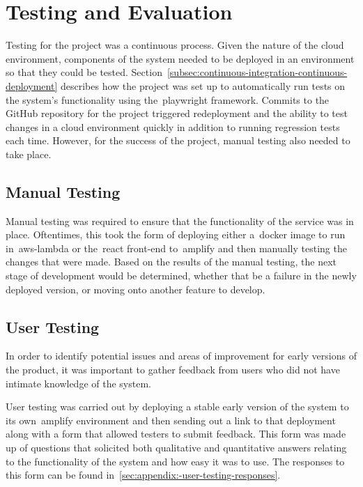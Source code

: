 \thispagestyle{plain}
\newpage
\section{Testing and Evaluation}\label{sec:testing-and-evaluation}

\normalsize

Testing for the project was a continuous process.
Given the nature of the cloud environment,
components of the system needed to be deployed in an environment so that they could be tested.
Section~\ref{subsec:continuous-integration-continuous-deployment} describes how the project was set up
to automatically run tests on the system's functionality using the~\gls{playwright} framework.
Commits to the GitHub repository for the project triggered redeployment and the ability
to test changes in a cloud environment quickly in addition to running regression tests each time.
However, for the success of the project, manual testing also needed to take place.

\subsection{Manual Testing}\label{subsec:manual-testing}

Manual testing was required to ensure that the functionality of the service was in place.
Oftentimes,
this took the form
of deploying either a~\gls{docker} image
to run in~\gls{aws-lambda} or the~\gls{react} front-end to~\gls{amplify} and
then manually testing the changes that were made.
Based on the results of the manual testing, the next stage of development would be determined,
whether that be a failure in the newly deployed version, or moving onto another feature to develop.

\subsection{User Testing}\label{subsec:user-testing}

In order to identify potential issues and areas of improvement for early versions of the product,
it was important to gather feedback from users who did not have intimate knowledge of the system.

User testing was carried out
by deploying a stable early version of the system to its own~\gls{amplify} environment
and then sending out a link to that deployment along with a form that allowed testers to submit feedback.
This form was made up of questions
that solicited both qualitative and quantitative answers relating to the functionality of the system
and how easy it was to use.
The responses to this form can be found in~\ref{sec:appendix:-user-testing-responses}.

